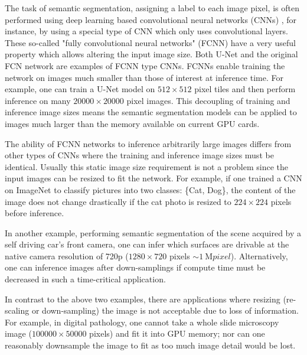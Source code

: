 \documentclass[letterpaper]{article} %
\begin{document}
The task of semantic segmentation, assigning a label to each image pixel, is often performed using deep learning based convolutional neural networks (CNNs) \cite{Badrinarayanan2015a,Ronneberger2015a}, for instance, by using a special type of CNN which only uses convolutional layers.
These so-called "fully convolutional neural networks" (FCNN) have a very useful property which allows altering the input image size. 
Both U-Net \cite{Ronneberger2015a} and the original FCN network \cite{Long2015} are examples of FCNN type CNNs. 
FCNNs enable training the network on images much smaller than those of interest at inference time. 
For example, one can train a U-Net model on $512 \times 512$ pixel tiles and then perform inference on many $\num{20000} \times \num{20000}$ pixel images. This decoupling of training and inference image sizes means the semantic segmentation models can be applied to images much larger than the memory available on current GPU cards. 

The ability of FCNN networks to inference arbitrarily large images differs from other types of CNNs where the training and inference image sizes must be identical. Usually this static image size requirement is not a problem since the input images can be resized to fit the network. For example, if one trained a CNN on ImageNet \cite{Russakovsky2015} to classify pictures into two classes: \{Cat, Dog\}, the content of the image does not change drastically if the cat photo is resized to $224 \times 224$ pixels before inference.

In another example, performing semantic segmentation of the scene acquired by a self driving car's front camera, one can infer which surfaces are drivable at the native camera resolution of 720p ($1280 \times 720$ pixels $\sim \SI{1}{\mega pixel}$). Alternatively, one can inference images after down-samplings if compute time must be decreased in such a time-critical application. 

In contrast to the above two examples, there are applications where resizing (re-scaling or down-sampling) the image is not acceptable due to loss of information. For example, in digital pathology, one cannot take a whole slide microscopy image ($\num{100000} \times \num{50000}$ pixels) and fit it into GPU memory; nor can one reasonably downsample the image to fit as too much image detail would be lost. 
\end{document}
